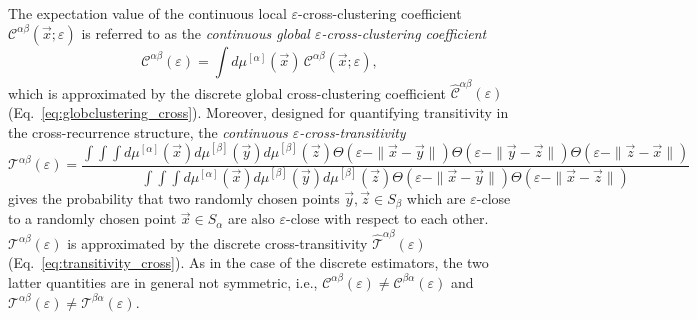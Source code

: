 The expectation value of the continuous local $\varepsilon$-cross-clustering coefficient $\mathcal{C}^{\alpha\beta}(\vec{x};\varepsilon)$ is referred to as the \textit{continuous global $\varepsilon$-cross-clustering coefficient}
\begin{equation}
\mathcal{C}^{\alpha\beta}(\varepsilon) = \int d\mu^{[\alpha]}(\vec{x})\, \mathcal{C}^{\alpha\beta}(\vec{x};\varepsilon),
\end{equation}
which is approximated by the discrete global cross-clustering coefficient $\hat{\mathcal{C}}^{\alpha\beta}(\varepsilon)$ (Eq.~\ref{eq:globclustering_cross}). Moreover, designed for quantifying transitivity in the cross-recurrence structure, the \textit{continuous $\varepsilon$-cross-transitivity}
\begin{equation}
\mathcal{T}^{\alpha\beta}(\varepsilon) = \frac{\int\!\!\!\int\!\!\!\int d\mu^{[\alpha]}(\vec{x}) d\mu^{[\beta]}(\vec{y}) d\mu^{[\beta]}(\vec{z}) \Theta(\varepsilon-\|\vec{x} - \vec{y}\|) \Theta(\varepsilon-\|\vec{y} - \vec{z}\|) \Theta(\varepsilon-\|\vec{z} - \vec{x}\|)}{\int\!\!\!\int\!\!\!\int d\mu^{[\alpha]}(\vec{x}) d\mu^{[\beta]}(\vec{y}) d\mu^{[\beta]}(\vec{z}) \Theta(\varepsilon-\|\vec{x} - \vec{y}\|) \Theta(\varepsilon-\|\vec{x} - \vec{z}\|)}
\end{equation}
gives the probability that two randomly chosen points $\vec{y},\vec{z}\in S_\beta$ which are $\varepsilon$-close to a randomly chosen point $\vec{x}\in S_\alpha$ are also $\varepsilon$-close with respect to each other. $\mathcal{T}^{\alpha\beta}(\varepsilon)$ is approximated by the discrete cross-transitivity $\hat{\mathcal{T}}^{\alpha\beta}(\varepsilon)$ (Eq.~\ref{eq:transitivity_cross}). As in the case of the discrete estimators, the two latter quantities are in general not symmetric, i.e., $\mathcal{C}^{\alpha\beta}(\varepsilon) \neq \mathcal{C}^{\beta\alpha}(\varepsilon)$ and $\mathcal{T}^{\alpha\beta}(\varepsilon) \neq \mathcal{T}^{\beta\alpha}(\varepsilon)$.

